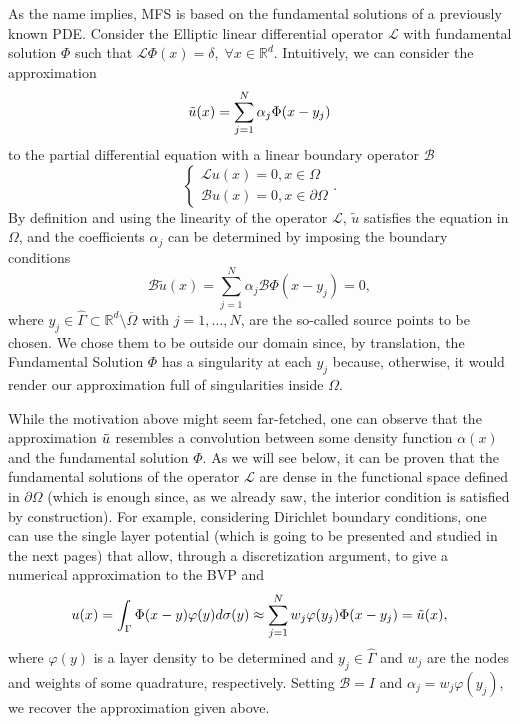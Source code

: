 As the name implies, MFS is based on the fundamental solutions of a previously known \ac{PDE}. Consider the Elliptic linear differential operator \(\mathcal{L}\) with fundamental solution \(\Phi\) such that \(\mathcal{L}\Phi(x) = \delta, \; \forall x \in \mathbb{R}^d\). Intuitively, we can consider the approximation
\[
\Tilde{u}(x) = \sum_{j=1}^{N}\alpha_j \Phi(x-y_j)
\]
to the partial differential equation with a linear boundary operator \(\mathcal{B}\)
\[
\begin{cases}
    \mathcal{L}u(x) = 0, x \in \Omega\\
    \mathcal{B}u(x) = 0, x \in \partial\Omega
\end{cases}. 
\]
By definition and using the linearity of the operator \(\mathcal{L}\), \(\tilde{u}\) satisfies the equation in \(\Omega\), and the coefficients \(\alpha_j\) can be determined by imposing the boundary conditions
\[
    \mathcal{B}\tilde{u}(x)=\sum_{j=1}^{N}\alpha_j \mathcal{B}\Phi(x-y_j)=0,
\]
where \(y_j \in \hat{\Gamma} \subset \mathbb{R}^d\setminus \overline{\Omega}\) with \(j=1,\dots,N\), are the so-called source points to be chosen. We chose them to be outside our domain since, by translation, the Fundamental Solution \(\Phi\) has a singularity at each \(y_j\) because, otherwise, it would render our approximation full of singularities inside \(\Omega\). 
\begin{remark}
    While the motivation above might seem far-fetched, one can observe that the approximation \(\Tilde{u}\) resembles a convolution between some density function \(\alpha(x)\) and the fundamental solution \(\Phi\). As we will see below, it can be proven that the fundamental solutions of the operator \(\mathcal{L}\) are dense in the functional space defined in \(\partial\Omega\) (which is enough since, as we already saw, the interior condition is satisfied by construction). For example, considering Dirichlet boundary conditions, one can use the single layer potential (which is going to be presented and studied in the next pages) that allow, through a discretization argument, to give a numerical approximation to the \ac{BVP} and
    \begin{equation}\label{mfs_approx_disc}
        u(x) = \int_{\Gamma}\Phi(x-y)\varphi(y)d\sigma(y) \approx \sum_{j=1}^{N}w_j \varphi(y_j) \Phi(x-y_j) = \Tilde{u}(x), 
    \end{equation}
    where \(\varphi(y)\) is a layer density to be determined and \(y_j \in \hat{\Gamma}\) and \(w_j\) are the nodes and weights of some quadrature, respectively. Setting \(\mathcal{B} = I\) and \(\alpha_j = w_j \varphi(y_j)\), we recover the approximation given above.
\end{remark}
